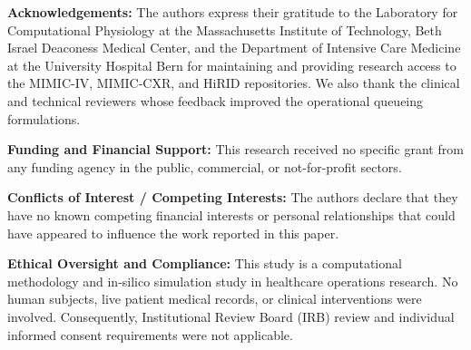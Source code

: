 \documentclass[11pt,letterpaper]{article}
\begin{document}
\vspace{8pt}

\textbf{\large Acknowledgements:}
The authors express their gratitude to the Laboratory for Computational Physiology at the Massachusetts Institute of Technology, Beth Israel Deaconess Medical Center, and the Department of Intensive Care Medicine at the University Hospital Bern for maintaining and providing research access to the MIMIC-IV, MIMIC-CXR, and HiRID repositories. We also thank the clinical and technical reviewers whose feedback improved the operational queueing formulations.

\vspace{8pt}

\textbf{\large Funding and Financial Support:}
This research received no specific grant from any funding agency in the public, commercial, or not-for-profit sectors.

\vspace{8pt}

\textbf{\large Conflicts of Interest / Competing Interests:}
The authors declare that they have no known competing financial interests or personal relationships that could have appeared to influence the work reported in this paper.

\vspace{8pt}

\textbf{\large Ethical Oversight and Compliance:}
This study is a computational methodology and in-silico simulation study in healthcare operations research. No human subjects, live patient medical records, or clinical interventions were involved. Consequently, Institutional Review Board (IRB) review and individual informed consent requirements were not applicable.
\end{document}
